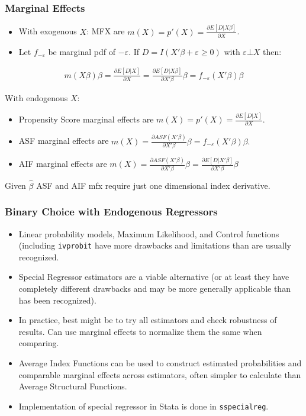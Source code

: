 \begin{frame}
\frametitle{ Marginal Effects}
\begin{itemize}
\item With exogenous $X$: MFX are $m(X) = p'(X) =  \frac{\partial E[D | X \beta]}{\partial X}$.
\item Let $f_{-\varepsilon}$ be marginal pdf of $-\varepsilon$. If $D=I(X' \beta + \varepsilon \geq 0)$ with $\varepsilon \bot X$ then:
\end{itemize}
\begin{eqnarray*}
m (X \beta) \beta= \frac{\partial E[D | X]}{\partial X}  = \frac{\partial E[D | X \beta]}{\partial X' \beta}  \beta  = f_{-\varepsilon}(X' \beta) \beta
\end{eqnarray*}

With endogenous $X$:
\begin{itemize}
\item Propensity Score marginal effects are $m(X) = p'(X) =  \frac{\partial E[D | X]}{\partial X}$.
\item ASF marginal effects are $m(X) =\frac{\partial ASF(X'\beta)}{\partial X'\beta} \beta = f_{-\varepsilon}(X' \beta) \beta.$
\item AIF marginal effects are $m(X) =\frac{\partial ASF(X'\beta)}{\partial X'\beta} \beta = \frac{\partial E[D | X' \beta ]}{\partial X' \beta} \beta$
\end{itemize}
Given $\hat{\beta}$ ASF and AIF mfx require just one dimensional index derivative.
\end{frame}

\begin{frame}
\frametitle{Binary Choice with Endogenous Regressors}
\begin{itemize}
\item Linear probability models, Maximum Likelihood, and Control functions (including \texttt{ivprobit} have more drawbacks and limitations than are usually recognized.
\item Special Regressor estimators are a viable alternative (or at least they have completely different drawbacks and may be more generally applicable than has been recognized).
\item In practice, best might be to try all estimators and check robustness of results. Can use marginal effects to normalize them the same when comparing.
\item Average Index Functions can be used to construct estimated probabilities and comparable marginal effects across estimators, often simpler to calculate than Average Structural Functions.
\item Implementation of special regressor in Stata is done in \texttt{sspecialreg}.
\end{itemize}
\end{frame}

